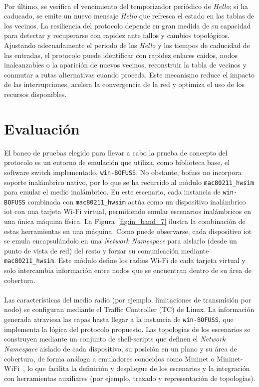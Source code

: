 \\
Por último, se verifica el vencimiento del temporizador periódico de \textit{Hello}; si ha caducado, se emite un nuevo mensaje \textit{Hello} que refresca el estado en las tablas de los vecinos. La resiliencia del protocolo depende en gran medida de su capacidad para detectar y recuperarse con rapidez ante fallos y cambios topológicos. Ajustando adecuadamente el periodo de los \textit{Hello} y los tiempos de caducidad de las entradas, el protocolo puede identificar con rapidez enlaces caídos, nodos inalcanzables o la aparición de nuevos vecinos, reconstruir la tabla de vecinos y conmutar a rutas alternativas cuando proceda. Este mecanismo reduce el impacto de las interrupciones, acelera la convergencia de la red y optimiza el uso de los recursos disponibles.

\section{Evaluación}

El banco de pruebas elegido para llevar a cabo la prueba de concepto del protocolo es un entorno de emulación que utiliza, como biblioteca base, el software switch implementado, \texttt{win-BOFUSS}. No obstante, \gls{bofuss} no incorpora soporte inalámbrico nativo, por lo que se ha recurrido al módulo \texttt{mac80211\_hwsim} para emular el medio inalámbrico. En este escenario, cada instancia de \texttt{win-BOFUSS} combinada con \texttt{mac80211\_hwsim} actúa como un dispositivo inalámbrico \gls{iot} con una tarjeta Wi-Fi virtual, permitiendo emular escenarios inalámbricos en una única máquina física. La Figura~\ref{fig:in_band_7} ilustra la combinación de estas herramientas en una máquina. Como puede observarse, cada dispositivo \gls{iot} se emula encapsulándolo en una \textit{Network Namespace} para aislarlo (desde un punto de vista de red) del resto y forzar su comunicación mediante \texttt{mac80211\_hwsim}. Este módulo define los radios Wi-Fi de cada tarjeta virtual y solo intercambia información entre nodos que se encuentran dentro de su área de cobertura.\\
\\
Las características del medio radio (por ejemplo, limitaciones de transmisión por nodo) se configuran mediante el Traffic Controller (TC) de Linux. La información generada atraviesa las capas hasta llegar a la instancia de  \texttt{win-BOFUSS}, que implementa la lógica del protocolo propuesto. Las topologías de los escenarios se construyen mediante un conjunto de shell-scripts que definen el \textit{Network Namespace} aislado de cada dispositivo, su posición en un plano y su área de cobertura, de forma análoga a emuladores conocidos como Mininet o Mininet-WiFi~\cite{mininet-wifi}, lo que facilita la definición y despliegue de los escenarios y la integración con herramientas auxiliares (por ejemplo, trazado y representación de topologías).


